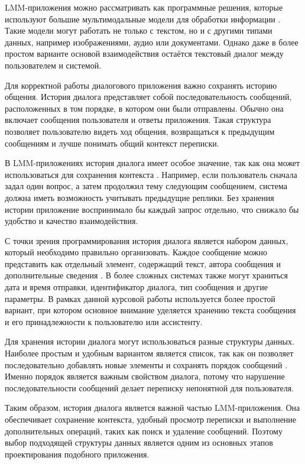 \documentclass[12pt,a4paper]{article}
\begin{document}
LMM-приложения можно рассматривать как программные решения, которые используют большие мультимодальные модели для обработки информации \cite{ref12,ref13}. Такие модели могут работать не только с текстом, но и с другими типами данных, например изображениями, аудио или документами. Однако даже в более простом варианте основой взаимодействия остаётся текстовый диалог между пользователем и системой.

Для корректной работы диалогового приложения важно сохранять историю общения. История диалога представляет собой последовательность сообщений, расположенных в том порядке, в котором они были отправлены. Обычно она включает сообщения пользователя и ответы приложения. Такая структура позволяет пользователю видеть ход общения, возвращаться к предыдущим сообщениям и лучше понимать общий контекст переписки.

В LMM-приложениях история диалога имеет особое значение, так как она может использоваться для сохранения контекста \cite{ref12}. Например, если пользователь сначала задал один вопрос, а затем продолжил тему следующим сообщением, система должна иметь возможность учитывать предыдущие реплики. Без хранения истории приложение воспринимало бы каждый запрос отдельно, что снижало бы удобство и качество взаимодействия.

С точки зрения программирования история диалога является набором данных, который необходимо правильно организовать. Каждое сообщение можно представить как отдельный элемент, содержащий текст, автора сообщения и дополнительные сведения \cite{ref1,ref2}. В более сложных системах также могут храниться дата и время отправки, идентификатор диалога, тип сообщения и другие параметры. В рамках данной курсовой работы используется более простой вариант, при котором основное внимание уделяется хранению текста сообщения и его принадлежности к пользователю или ассистенту.

Для хранения истории диалога могут использоваться разные структуры данных. Наиболее простым и удобным вариантом является список, так как он позволяет последовательно добавлять новые элементы и сохранять порядок сообщений \cite{ref1}. Именно порядок является важным свойством диалога, потому что нарушение последовательности сообщений делает переписку непонятной для пользователя.

Таким образом, история диалога является важной частью LMM-приложения. Она обеспечивает сохранение контекста, удобный просмотр переписки и выполнение дополнительных операций, таких как поиск и удаление сообщений. Поэтому выбор подходящей структуры данных является одним из основных этапов проектирования подобного приложения.
\end{document}
